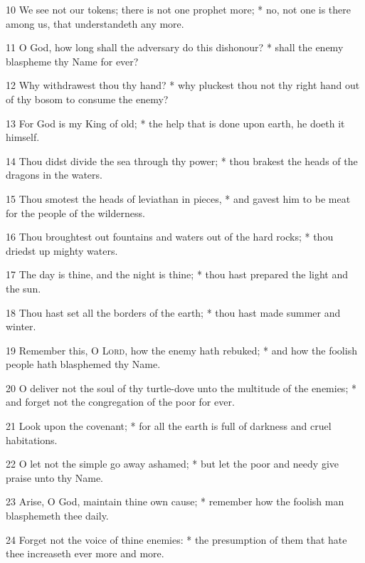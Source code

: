 10 We see not our tokens; there is not one prophet more; * no, not one is there among us, that understandeth any more.\par
11 O God, how long shall the adversary do this dishonour? * shall the enemy blaspheme thy Name for ever?\par
12 Why withdrawest thou thy hand? * why pluckest thou not thy right hand out of thy bosom to consume the enemy?\par
13 For God is my King of old; * the help that is done upon earth, he doeth it himself.\par
14 Thou didst divide the sea through thy power; * thou brakest the heads of the dragons in the waters.\par
15 Thou smotest the heads of leviathan in pieces, * and gavest him to be meat for the people of the wilderness.\par
16 Thou broughtest out fountains and waters out of the hard rocks; * thou driedst up mighty waters.\par
17 The day is thine, and the night is thine; * thou hast prepared the light and the sun.\par
18 Thou hast set all the borders of the earth; * thou hast made summer and winter.\par
19 Remember this, O {\textsc{Lord}}, how the enemy hath rebuked; * and how the foolish people hath blasphemed thy Name.\par
20 O deliver not the soul of thy turtle-dove unto the multitude of the enemies; * and forget not the congregation of the poor for ever.\par
21 Look upon the covenant; * for all the earth is full of darkness and cruel habitations.\par
22 O let not the simple go away ashamed; * but let the poor and needy give praise unto thy Name.\par
23 Arise, O God, maintain thine own cause; * remember how the foolish man blasphemeth thee daily.\par
24 Forget not the voice of thine enemies: * the presumption of them that hate thee increaseth ever more and more.
